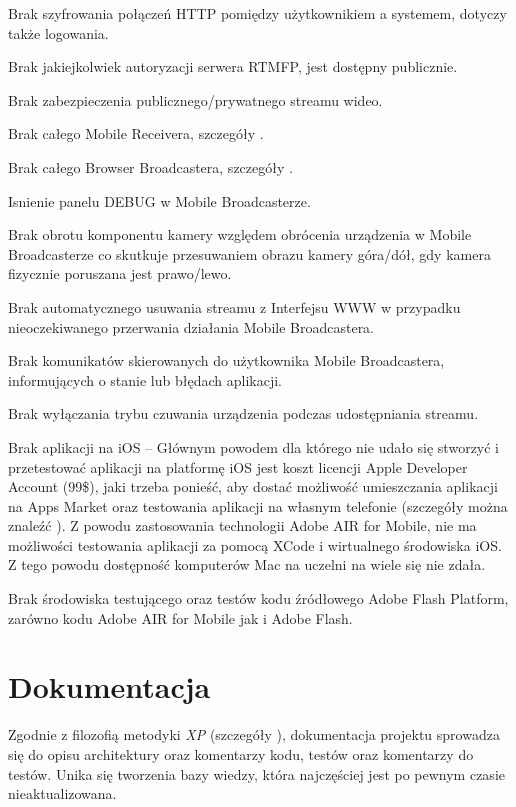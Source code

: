 \begin{packed_item}
    \item{Brak szyfrowania połączeń HTTP pomiędzy użytkownikiem a systemem, dotyczy także logowania.}
    \item{Brak jakiejkolwiek autoryzacji serwera RTMFP, jest dostępny publicznie.}
    \item{Brak zabezpieczenia publicznego/prywatnego streamu wideo.}
    \item{Brak całego Mobile Receivera, szczegóły .}
    \item{Brak całego Browser Broadcastera, szczegóły .}
    \item{Isnienie panelu DEBUG w Mobile Broadcasterze.}
    \item{Brak obrotu komponentu kamery względem obrócenia urządzenia w Mobile Broadcasterze co skutkuje przesuwaniem obrazu kamery góra/dół, gdy kamera fizycznie poruszana jest prawo/lewo.}
    \item{Brak automatycznego usuwania streamu z Interfejsu WWW w przypadku nieoczekiwanego przerwania działania Mobile Broadcastera.}
    \item{Brak komunikatów skierowanych do użytkownika Mobile Broadcastera, informujących o stanie lub błędach aplikacji.}
    \item{Brak wyłączania trybu czuwania urządzenia podczas udostępniania streamu.}
    \item{Brak aplikacji na iOS -- Głównym powodem dla którego nie udało się stworzyć i przetestować aplikacji na platformę iOS jest koszt licencji Apple Developer Account (99\$), jaki trzeba ponieść, aby dostać możliwość umieszczania aplikacji na Apps Market oraz testowania aplikacji na własnym telefonie (szczegóły można znaleźć \cite{UnknAuth11}). Z powodu zastosowania technologii Adobe AIR for Mobile, nie ma możliwości testowania aplikacji za pomocą XCode i wirtualnego środowiska iOS. Z tego powodu dostępność komputerów Mac na uczelni na wiele się nie zdała.}
    \item{Brak środowiska testującego oraz testów kodu źródłowego Adobe Flash Platform, zarówno kodu Adobe AIR for Mobile jak i Adobe Flash.}
\end{packed_item}

\newpage
\section{Dokumentacja}
Zgodnie z filozofią metodyki \textit{XP} (szczegóły ), dokumentacja projektu sprowadza się do opisu architektury oraz komentarzy kodu, testów oraz komentarzy do testów. Unika się tworzenia bazy wiedzy, która najczęściej jest po pewnym czasie nieaktualizowana.

